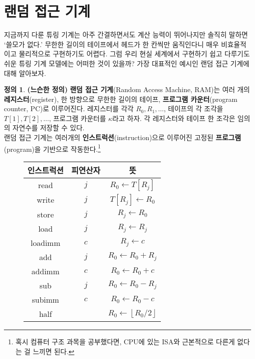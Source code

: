 \documentclass[b5paper, 11pt]{book}
\theoremstyle{definition}
\newtheorem{defn}{정의}[chapter]
\begin{document}
\section{랜덤 접근 기계}
지금까지 다룬 튜링 기계는 아주 간결하면서도 계산 능력이 뛰어나지만 솔직히 말하면 `쓸모가 없다.' 무한한 길이의 테이프에서 헤드가 한 칸씩만 움직인다니 매우 비효율적이고 물리적으로 구현하기도 어렵다. 그럼 우리 현실 세계에서 구현하기 쉽고 다루기도 쉬운 튜링 기계 모델에는 어떠한 것이 있을까? 가장 대표적인 예시인 랜덤 접근 기계에 대해 알아보자.
\begin{defn} \label{ram definition}
    \textbf{(느슨한 정의)}
    \textbf{랜덤 접근 기계}(Random Access Machine, RAM)는 여러 개의 \textbf{레지스터}(register), 한 방향으로 무한한 길이의 테이프, \textbf{프로그램 카운터}(program counter, PC)로 이루어진다. 레지스터를 각각 $R_0, R_1, \ldots$, 테이프의 각 조각을 $T[1], T[2], \ldots $, 프로그램 카운터를 $\kappa$라고 하자. 각 레지스터와 테이프 한 조각은 임의의 자연수를 저장할 수 있다. \\ 
    랜덤 접근 기계는 여러개의 \textbf{인스트럭션}(instruction)으로 이루어진 고정된 \textbf{프로그램}(program)을 기반으로 작동한다.\footnote{혹시 컴퓨터 구조 과목을 공부했다면, CPU에 있는 ISA와 근본적으로 다른게 없다는 걸 느끼면 된다.}
    \begin{figure}[!ht] 
        \centering
        \begin{tabular}{ ccc }
            인스트럭션 & 피연산자 & 뜻 \\ 
            \hline
            \hline
            read & $j$ & $R_0 \gets T[R_j]$ \\ 
            \hline
            write & $j$ & $T[R_j] \gets R_0$ \\ 
            \hline 
            store & $j$ & $R_j \gets R_0$ \\ 
            \hline 
            load & $j$ & $R_j \gets R_j$ \\ 
            \hline 
            loadimm & $c$ & $R_j \gets c$ \\ 
            \hline 
            add & $j$ & $R_0 \gets R_0 + R_j$ \\ 
            \hline 
            addimm & $c$ & $R_0 \gets R_0 + c$ \\ 
            \hline 
            sub & $j$ & $R_0 \gets R_0 - R_j$ \\ 
            \hline
            subimm & $c$ & $R_0 \gets R_0 - c$ \\ 
            \hline 
            half & & $R_0 \gets \left\lfloor R_0 / 2 \right\rfloor$ \\ 

\end{tabular}
\end{figure}
\end{defn}
\end{document}
